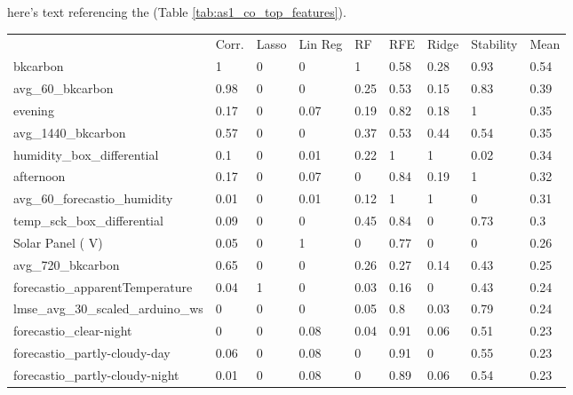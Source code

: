 here's text referencing the (Table \ref{tab:as1_co_top_features}).

\begin{table}[H]
\centering
\begin{tabular}{lllllllll}
\\
\\
\toprule
     & Corr. & Lasso & Lin Reg & RF   & RFE  & Ridge & Stability & Mean \\
\midrule
bkcarbon                            & 1     & 0          & 0    & 1    & 0.58  & 0.28      & 0.93 & 0.54 \\
avg\_60\_bkcarbon                   & 0.98  & 0          & 0    & 0.25 & 0.53  & 0.15      & 0.83 & 0.39 \\
evening                             & 0.17  & 0          & 0.07 & 0.19 & 0.82  & 0.18      & 1    & 0.35 \\
avg\_1440\_bkcarbon                 & 0.57  & 0          & 0    & 0.37 & 0.53  & 0.44      & 0.54 & 0.35 \\
humidity\_box\_differential         & 0.1   & 0          & 0.01 & 0.22 & 1     & 1         & 0.02 & 0.34 \\
afternoon                           & 0.17  & 0          & 0.07 & 0    & 0.84  & 0.19      & 1    & 0.32 \\
avg\_60\_forecastio\_humidity       & 0.01  & 0          & 0.01 & 0.12 & 1     & 1         & 0    & 0.31 \\
temp\_sck\_box\_differential        & 0.09  & 0          & 0    & 0.45 & 0.84  & 0         & 0.73 & 0.3  \\
Solar Panel ( V)                    & 0.05  & 0          & 1    & 0    & 0.77  & 0         & 0    & 0.26 \\
avg\_720\_bkcarbon                  & 0.65  & 0          & 0    & 0.26 & 0.27  & 0.14      & 0.43 & 0.25 \\
forecastio\_apparentTemperature     & 0.04  & 1          & 0    & 0.03 & 0.16  & 0         & 0.43 & 0.24 \\
lmse\_avg\_30\_scaled\_arduino\_ws  & 0     & 0          & 0    & 0.05 & 0.8   & 0.03      & 0.79 & 0.24 \\
forecastio\_clear-night             & 0     & 0          & 0.08 & 0.04 & 0.91  & 0.06      & 0.51 & 0.23 \\
forecastio\_partly-cloudy-day       & 0.06  & 0          & 0.08 & 0    & 0.91  & 0         & 0.55 & 0.23 \\
forecastio\_partly-cloudy-night     & 0.01  & 0          & 0.08 & 0    & 0.89  & 0.06      & 0.54 & 0.23 \\

\end{tabular}
\end{table}
